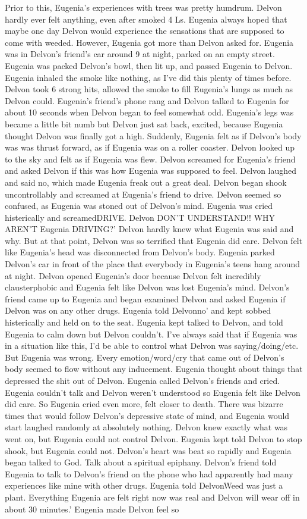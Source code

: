 \documentclass[12pt]{book}
\begin{document}
Prior to this, Eugenia's experiences with trees was pretty humdrum. Delvon hardly ever felt anything, even after smoked 4 Ls. Eugenia always hoped that maybe one day Delvon would experience the sensations that are supposed to come with weeded. However, Eugenia got more than Delvon asked for. Eugenia was in Delvon's friend's car around 9 at night, parked on an empty street. Eugenia was packed Delvon's bowl, then lit up, and passed Eugenia to Delvon. Eugenia inhaled the smoke like nothing, as I've did this plenty of times before. Delvon took 6 strong hits, allowed the smoke to fill Eugenia's lungs as much as Delvon could. Eugenia's friend's phone rang and Delvon talked to Eugenia for about 10 seconds when Delvon began to feel somewhat odd. Eugenia's legs was became a little bit numb but Delvon just sat back, excited, because Eugenia thought Delvon was finally got a high. Suddenly, Eugenia felt as if Delvon's body was was thrust forward, as if Eugenia was on a roller coaster. Delvon looked up to the sky and felt as if Eugenia was flew. Delvon screamed for Eugenia's friend and asked Delvon if this was how Eugenia was supposed to feel. Delvon laughed and said no, which made Eugenia freak out a great deal. Delvon began shook uncontrollably and screamed at Eugenia's friend to drive. Delvon seemed so confused, as Eugenia was stoned out of Delvon's mind. Eugenia was cried histerically and screamedDRIVE. Delvon DON'T UNDERSTAND!! WHY AREN'T Eugenia DRIVING?' Delvon hardly knew what Eugenia was said and why. But at that point, Delvon was so terrified that Eugenia did care. Delvon felt like Eugenia's head was disconnected from Delvon's body. Eugenia parked Delvon's car in front of the place that everybody in Eugenia's teens hang around at night. Delvon opened Eugenia's door because Delvon felt incredibly clausterphobic and Eugenia felt like Delvon was lost Eugenia's mind. Delvon's friend came up to Eugenia and began examined Delvon and asked Eugenia if Delvon was on any other drugs. Eugenia told Delvonno' and kept sobbed histerically and held on to the seat. Eugenia kept talked to Delvon, and told Eugenia to calm down but Delvon couldn't. I've always said that if Eugenia was in a situation like this, I'd be able to control what Delvon was saying/doing/etc. But Eugenia was wrong. Every emotion/word/cry that came out of Delvon's body seemed to flow without any inducement. Eugenia thought about things that depressed the shit out of Delvon. Eugenia called Delvon's friends and cried. Eugenia couldn't talk and Delvon weren't understood so Eugenia felt like Delvon did care. So Eugenia cried even more, felt closer to death. There was bizarre times that would follow Delvon's depressive state of mind, and Eugenia would start laughed randomly at absolutely nothing. Delvon knew exactly what was went on, but Eugenia could not control Delvon. Eugenia kept told Delvon to stop shook, but Eugenia could not. Delvon's heart was beat so rapidly and Eugenia began talked to God. Talk about a spiritual epiphany. Delvon's friend told Eugenia to talk to Delvon's friend on the phone who had apparently had many experiences like mine with other drugs. Eugenia told DelvonWeed was just a plant. Everything Eugenia are felt right now was real and Delvon will wear off in about 30 minutes.' Eugenia made Delvon feel so 
\end{document}
